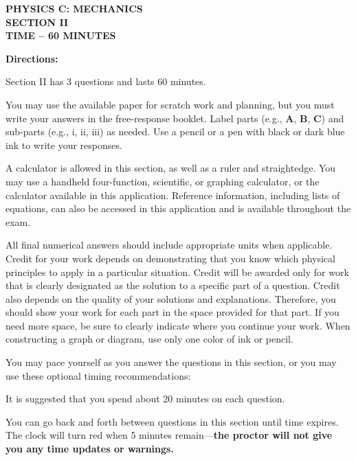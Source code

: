 \documentclass[12pt]{../../oss-apphys-exam}
\begin{document}
\begin{center}
  {
    \Large
    \textbf{PHYSICS C: MECHANICS\\SECTION II\\TIME -- 60 MINUTES}
  }
\end{center}

\vspace{2in}
\textbf{Directions:}

Section II has 3 questions and lasts 60 minutes.

You may use the available paper for scratch work and planning, but you must
write your answers in the free-response booklet. Label parts (e.g., \textbf{A},
\textbf{B}, \textbf{C}) and sub-parts (e.g., i, ii, iii) as needed. Use a
pencil or a pen with black or dark blue ink to write your responses.

A calculator is allowed in this section, as well as a ruler and straightedge.
You may use a handheld four-function, scientific, or graphing calculator, or
the calculator available in this application. Reference information, including
lists of equations, can also be accessed in this application and is available
throughout the exam.

All final numerical answers should include appropriate units when applicable.
Credit for your work depends on demonstrating that you know which physical
principles to apply in a particular situation. Credit will be awarded only for
work that is clearly designated as the solution to a specific part of a
question. Credit also depends on the quality of your solutions and explanations.
Therefore, you should show your work for each part in the space provided for
that part. If you need more space, be sure to clearly indicate where you
continue your work. When constructing a graph or diagram, use only one color of
ink or pencil.

You may pace yourself as you answer the questions in this section, or you may
use these optional timing recommendations:

It is suggested that you spend about 20 minutes on each question.

You can go back and forth between questions in this section until time expires.
The clock will turn red when 5 minutes remain---\textbf{the proctor will not
  give you any time updates or warnings.}
\newpage


\end{document}
